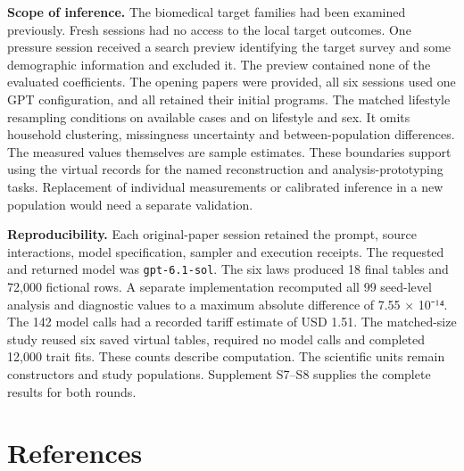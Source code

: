 \documentclass[sigconf,anonymous,nonacm]{acmart}
\begin{document}
\textbf{Scope of inference.} The biomedical target families had been examined previously. Fresh sessions had no access to the local target outcomes. One pressure session received a search preview identifying the target survey and some demographic information and excluded it. The preview contained none of the evaluated coefficients. The opening papers were provided, all six sessions used one GPT configuration, and all retained their initial programs. The matched lifestyle resampling conditions on available cases and on lifestyle and sex. It omits household clustering, missingness uncertainty and between-population differences. The measured values themselves are sample estimates. These boundaries support using the virtual records for the named reconstruction and analysis-prototyping tasks. Replacement of individual measurements or calibrated inference in a new population would need a separate validation.


\textbf{Reproducibility.} Each original-paper session retained the prompt, source interactions, model specification, sampler and execution receipts. The requested and returned model was \texttt{gpt-\allowbreak{}6.1-\allowbreak{}sol}. The six laws produced 18 final tables and 72,000 fictional rows. A separate implementation recomputed all 99 seed-level analysis and diagnostic values to a maximum absolute difference of 7.55 × 10⁻¹⁴. The 142 model calls had a recorded tariff estimate of USD 1.51. The matched-size study reused six saved virtual tables, required no model calls and completed 12,000 trait fits. These counts describe computation. The scientific units remain constructors and study populations. Supplement S7–\allowbreak{}S8 supplies the complete results for both rounds.


\FloatBarrier

\section*{References}

\begingroup\small

\renewcommand{\labelenumi}{[\arabic{enumi}]}
\end{document}
